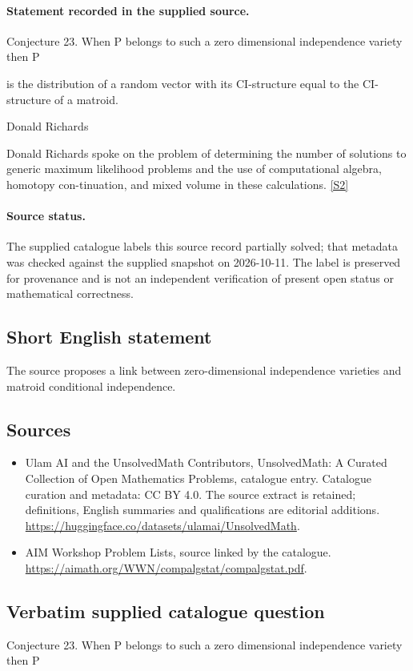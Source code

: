 \documentclass[11pt]{article}
\begin{document}
\paragraph{Statement recorded in the supplied source.}
Conjecture 23. When P belongs to such a zero dimensional independence variety then P

is the distribution of a random vector with its CI-structure equal to the CI-structure of a matroid.

Donald Richards

Donald Richards spoke on the problem of determining the number of solutions to generic maximum likelihood problems and the use of computational algebra, homotopy con-tinuation, and mixed volume in these calculations. \href{https://aimath.org/WWN/compalgstat/compalgstat.pdf}{[S2]}
\paragraph{Source status.}
The supplied catalogue labels this source record partially solved; that metadata was checked against the supplied snapshot on 2026-10-11. The label is preserved for provenance and is not an independent verification of present open status or mathematical correctness.
\subsection{Short English statement}
The source proposes a link between zero-dimensional independence varieties and matroid conditional independence.
\subsection{Sources}
\begin{itemize}
\item[S1] Ulam AI and the UnsolvedMath Contributors, UnsolvedMath: A Curated Collection of Open Mathematics Problems, catalogue entry. Catalogue curation and metadata: CC BY 4.0. The source extract is retained; definitions, English summaries and qualifications are editorial additions.
\url{https://huggingface.co/datasets/ulamai/UnsolvedMath}.
\item[S2] AIM Workshop Problem Lists, source linked by the catalogue.
\url{https://aimath.org/WWN/compalgstat/compalgstat.pdf}.
\end{itemize}
\subsection{Verbatim supplied catalogue question}
Conjecture 23. When P belongs to such a zero dimensional independence variety then P
\end{document}

